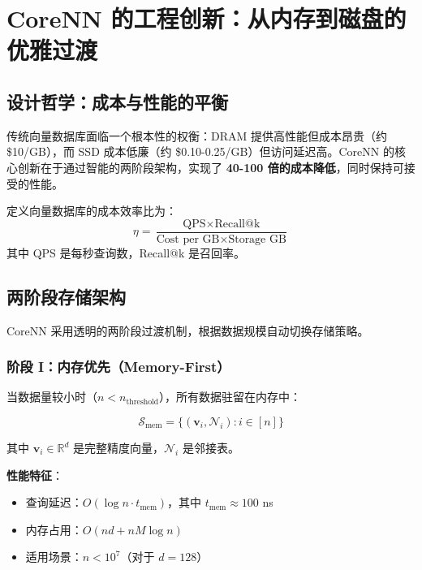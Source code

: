 \section{CoreNN 的工程创新：从内存到磁盘的优雅过渡}

\subsection{设计哲学：成本与性能的平衡}

传统向量数据库面临一个根本性的权衡：DRAM 提供高性能但成本昂贵（约 \$10/GB），而 SSD 成本低廉（约 \$0.10-0.25/GB）但访问延迟高。CoreNN 的核心创新在于通过智能的两阶段架构，实现了 \textbf{40-100 倍的成本降低}，同时保持可接受的性能。

\begin{definition}[成本效率比]
定义向量数据库的成本效率比为：
\begin{equation}
\eta = \frac{\text{QPS} \times \text{Recall@k}}{\text{Cost per GB} \times \text{Storage GB}}
\end{equation}
其中 QPS 是每秒查询数，Recall@k 是召回率。
\end{definition}

\subsection{两阶段存储架构}

CoreNN 采用透明的两阶段过渡机制，根据数据规模自动切换存储策略。

\subsubsection{阶段 I：内存优先（Memory-First）}

当数据量较小时（$n < n_{\text{threshold}}$），所有数据驻留在内存中：

\begin{equation}
\mathcal{S}_{\text{mem}} = \{(\mathbf{v}_i, \mathcal{N}_i) : i \in [n]\}
\end{equation}

其中 $\mathbf{v}_i \in \mathbb{R}^d$ 是完整精度向量，$\mathcal{N}_i$ 是邻接表。

\textbf{性能特征}：
\begin{itemize}
    \item 查询延迟：$O(\log n \cdot t_{\text{mem}})$，其中 $t_{\text{mem}} \approx 100$ ns
    \item 内存占用：$O(nd + nM\log n)$
    \item 适用场景：$n < 10^7$（对于 $d=128$）
\end{itemize}


